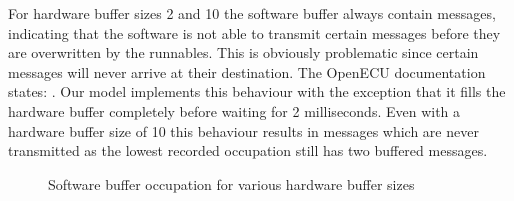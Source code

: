 For hardware buffer sizes 2 and 10 the software buffer always contain messages, indicating that the software is not able to transmit certain messages before they are overwritten by the runnables. This is obviously problematic since certain messages will never arrive at their destination. The OpenECU documentation states: . Our model implements this behaviour with the exception that it fills the hardware buffer completely before waiting for 2 milliseconds. Even with a hardware buffer size of 10 this behaviour results in messages which are never transmitted as the lowest recorded occupation still has two buffered messages. 
\begin{figure}[htb]
    \centering
    
    \caption{Software buffer occupation for various hardware buffer sizes}
    \label{fig:buffer_size}
\end{figure}